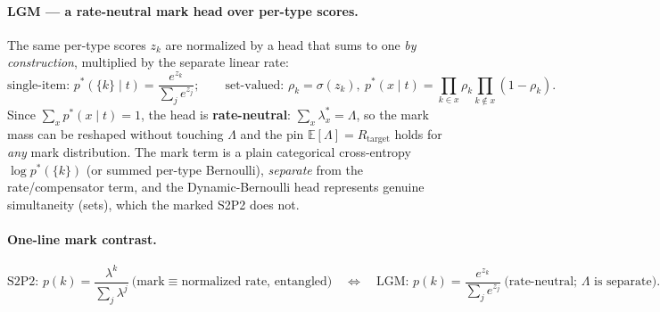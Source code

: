 \documentclass[11pt]{article}
\newcommand{\Lam}{\Lambda}
\begin{document}
\paragraph{LGM --- a rate-neutral mark head over per-type scores.}
The same per-type scores $z_k$ are normalized by a head that sums to one \emph{by construction},
multiplied by the separate linear rate:
\[
\text{single-item: } p^*(\{k\}\mid t)=\frac{e^{z_k}}{\sum_j e^{z_j}};\qquad
\text{set-valued: } \rho_k=\sigma(z_k),\ p^*(x\mid t)=\!\prod_{k\in x}\rho_k\!\prod_{k\notin x}(1-\rho_k).
\]
Since $\sum_x p^*(x\mid t)=1$, the head is \textbf{rate-neutral}: $\sum_x\lambda_x^*=\Lam$, so the mark
mass can be reshaped without touching $\Lam$ and the pin $\mathbb{E}[\Lam]=R_{\mathrm{target}}$ holds for
\emph{any} mark distribution. The mark term is a plain categorical cross-entropy
$\log p^*(\{k\})$ (or summed per-type Bernoulli), \emph{separate} from the rate/compensator term, and
the Dynamic-Bernoulli head represents genuine simultaneity (sets), which the marked S2P2 does not.

\paragraph{One-line mark contrast.}
\[
\text{S2P2: } p(k)=\frac{\lambda^k}{\sum_j\lambda^j}\ \text{(mark}\equiv\text{normalized rate, entangled)}
\quad\Longleftrightarrow\quad
\text{LGM: } p(k)=\frac{e^{z_k}}{\sum_j e^{z_j}}\ \text{(rate-neutral; }\Lam\text{ is separate).}
\]
\end{document}
